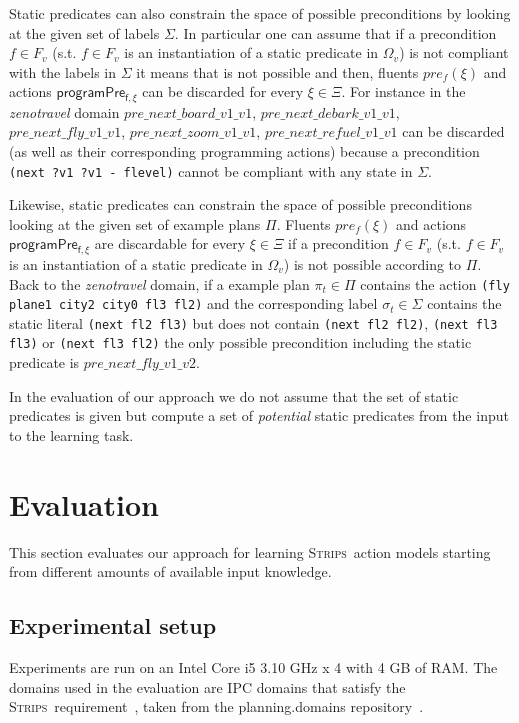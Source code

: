 \documentclass[letterpaper]{article} %
\newcommand{\strips}{\textsc{Strips}}     %
\begin{document}
Static predicates can also constrain the space of possible preconditions by looking at the given set of labels $\Sigma$. In particular one can assume that if a precondition $f\in F_v$ (s.t. $f\in F_v$ is an instantiation of a static predicate in $\Omega_v$) is not compliant with the labels in $\Sigma$ it means that is not possible and then, fluents $pre_f(\xi)$ and actions $\mathsf{programPre_{f,\xi}}$ can be discarded for every $\xi\in\Xi$. For instance in the {\em zenotravel} domain $pre\_next\_board\_v1\_v1$, $pre\_next\_debark\_v1\_v1$, $pre\_next\_fly\_v1\_v1$, $pre\_next\_zoom\_v1\_v1$, $pre\_next\_refuel\_v1\_v1$ can be discarded (as well as their corresponding programming actions) because a precondition {\tt\small(next ?v1 ?v1 - flevel)} cannot be compliant with any state in $\Sigma$.

Likewise, static predicates can constrain the space of possible preconditions looking at the given set of example plans $\Pi$. Fluents $pre_f(\xi)$ and actions $\mathsf{programPre_{f,\xi}}$ are discardable for every $\xi\in\Xi$ if a precondition $f\in F_v$ (s.t. $f\in F_v$ is an instantiation of a static predicate in $\Omega_v$) is not possible according to $\Pi$. Back to the {\em zenotravel} domain, if a example plan $\pi_t\in \Pi$ contains the action {\tt\small (fly plane1 city2 city0 fl3 fl2)} and the corresponding label $\sigma_t\in\Sigma$ contains the static literal {\tt\small (next fl2 fl3)} but does not contain {\tt\small (next fl2 fl2)}, {\tt\small (next fl3 fl3)} or {\tt\small (next fl3 fl2)} the only possible precondition including the static predicate is $pre\_next\_fly\_v1\_v2$.

In the evaluation of our approach we do not assume that the set of static predicates is given but compute a set of {\em potential} static predicates from the input to the learning task.


\section{Evaluation}
This section evaluates our approach for learning \strips\ action models starting from different amounts of available input knowledge.

\subsection{Experimental setup}
Experiments are run on an Intel Core i5 3.10 GHz x 4 with 4 GB of RAM. The domains used in the evaluation are IPC domains that satisfy the \strips\ requirement~\cite{fox2003pddl2}, taken from the {\sc planning.domains} repository~\cite{muise2016planning}.
\end{document}

